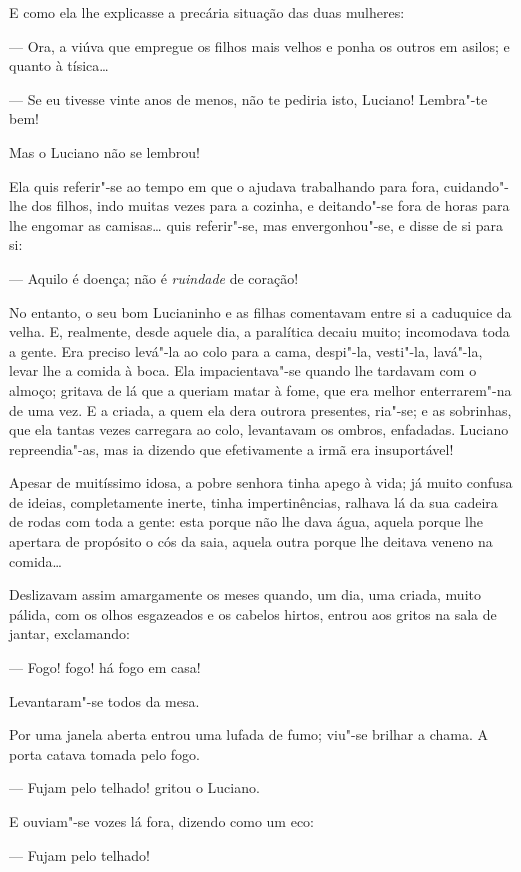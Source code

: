 E como ela lhe explicasse a precária situação das duas mulheres:

--- Ora, a viúva que empregue os filhos mais velhos e ponha os outros em
asilos; e quanto à tísica\ldots{}

--- Se eu tivesse vinte anos de menos, não te pediria isto, Luciano!
Lembra"-te bem!

Mas o Luciano não se lembrou!

Ela quis referir"-se ao tempo em que o ajudava trabalhando para fora,
cuidando"-lhe dos filhos, indo muitas vezes para a cozinha, e deitando"-se
fora de horas para lhe engomar as camisas\ldots{} quis referir"-se, mas
envergonhou"-se, e disse de si para si:

--- Aquilo é doença; não é \emph{ruindade} de coração!

No entanto, o seu bom Lucianinho e as filhas comentavam entre si a
caduquice da velha. E, realmente, desde aquele dia, a paralítica decaiu
muito; incomodava toda a gente. Era preciso levá"-la ao colo para a cama,
despi"-la, vesti"-la, lavá"-la, levar lhe a comida à boca. Ela
impacientava"-se quando lhe tardavam com o almoço; gritava de lá que a
queriam matar à fome, que era melhor enterrarem"-na de uma vez. E a
criada, a quem ela dera outrora presentes, ria"-se; e as sobrinhas, que
ela tantas vezes carregara ao colo, levantavam os ombros, enfadadas.
Luciano repreendia"-as, mas ia dizendo que efetivamente a irmã era
insuportável!

Apesar de muitíssimo idosa, a pobre senhora tinha apego à vida; já muito
confusa de ideias, completamente inerte, tinha impertinências, ralhava
lá da sua cadeira de rodas com toda a gente: esta porque não lhe dava
água, aquela porque lhe apertara de propósito o cós da saia, aquela
outra porque lhe deitava veneno na comida\ldots{}

Deslizavam assim amargamente os meses quando, um dia, uma criada, muito
pálida, com os olhos esgazeados e os cabelos hirtos, entrou aos gritos
na sala de jantar, exclamando:

--- Fogo! fogo! há fogo em casa!

Levantaram"-se todos da mesa.

Por uma janela aberta entrou uma lufada de fumo; viu"-se brilhar a chama.
A porta catava tomada pelo fogo.

--- Fujam pelo telhado! gritou o Luciano.

E ouviam"-se vozes lá fora, dizendo como um eco:

--- Fujam pelo telhado!

